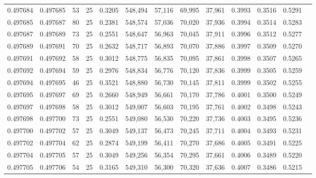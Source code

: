 \begin{tabular}{rrrrrrrrrrrrr}
0.497684 & 0.497685 &    53 &  25 &                                     0.3205 & 548,494 &  57,116 &  69,995 &  37,961 & 0.3993 & 0.3516 & 0.5291 \\
0.497685 & 0.497687 &    80 &  25 &                                     0.2381 & 548,574 &  57,036 &  70,020 &  37,936 & 0.3994 & 0.3514 & 0.5283 \\
0.497687 & 0.497689 &    73 &  25 &                                     0.2551 & 548,647 &  56,963 &  70,045 &  37,911 & 0.3996 & 0.3512 & 0.5277 \\
0.497689 & 0.497691 &    70 &  25 &                                     0.2632 & 548,717 &  56,893 &  70,070 &  37,886 & 0.3997 & 0.3509 & 0.5270 \\
0.497691 & 0.497692 &    58 &  25 &                                     0.3012 & 548,775 &  56,835 &  70,095 &  37,861 & 0.3998 & 0.3507 & 0.5265 \\
0.497692 & 0.497694 &    59 &  25 &                                     0.2976 & 548,834 &  56,776 &  70,120 &  37,836 & 0.3999 & 0.3505 & 0.5259 \\
0.497694 & 0.497695 &    46 &  25 &                                     0.3521 & 548,880 &  56,730 &  70,145 &  37,811 & 0.3999 & 0.3502 & 0.5255 \\
0.497695 & 0.497697 &    69 &  25 &                                     0.2660 & 548,949 &  56,661 &  70,170 &  37,786 & 0.4001 & 0.3500 & 0.5249 \\
0.497697 & 0.497698 &    58 &  25 &                                     0.3012 & 549,007 &  56,603 &  70,195 &  37,761 & 0.4002 & 0.3498 & 0.5243 \\
0.497698 & 0.497700 &    73 &  25 &                                     0.2551 & 549,080 &  56,530 &  70,220 &  37,736 & 0.4003 & 0.3495 & 0.5236 \\
0.497700 & 0.497702 &    57 &  25 &                                     0.3049 & 549,137 &  56,473 &  70,245 &  37,711 & 0.4004 & 0.3493 & 0.5231 \\
0.497702 & 0.497704 &    62 &  25 &                                     0.2874 & 549,199 &  56,411 &  70,270 &  37,686 & 0.4005 & 0.3491 & 0.5225 \\
0.497704 & 0.497705 &    57 &  25 &                                     0.3049 & 549,256 &  56,354 &  70,295 &  37,661 & 0.4006 & 0.3489 & 0.5220 \\
0.497705 & 0.497706 &    54 &  25 &                                     0.3165 & 549,310 &  56,300 &  70,320 &  37,636 & 0.4007 & 0.3486 & 0.5215 \\

\end{tabular}
